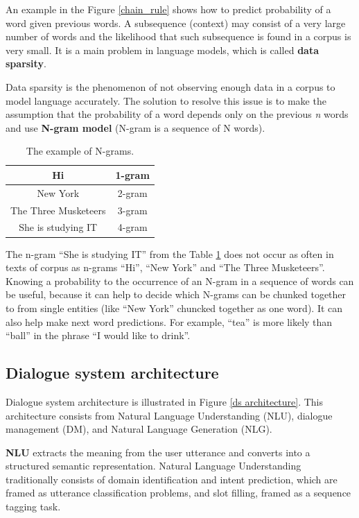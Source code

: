 An example in the Figure \ref{chain_rule} shows how to predict probability of a word given previous words. A subsequence (context) may consist of a very large number of words and the likelihood that such subsequence is found in a corpus is very small. It is a main problem in language models, which is called \textbf{data sparsity}.

Data sparsity is the phenomenon of not observing enough data in a corpus to model language accurately. The solution to resolve this issue is to make the assumption that the probability of a word depends only on the previous \textit{n} words and use \textbf{N-gram model} (N-gram is a sequence of N words).

\begin{table}[t]
  \centering
   \begin{tabular}{|c|c|} 
   \hline
    Hi & 1-gram \\
   \hline
    New York & 2-gram \\
   \hline
   The Three Musketeers & 3-gram \\
   \hline
   She is studying IT & 4-gram \\
   \hline
   \end{tabular}
   \caption{The example of N-grams.}
  \label{tab:n_gram}
\end{table}

The n-gram ``She is studying IT'' from the Table \ref{tab:n_gram} does not occur as often in texts of corpus as n-grams ``Hi'', ``New York'' and ``The Three Musketeers''. Knowing a probability to the occurrence of an N-gram in a sequence of words can be useful, because it can help to decide which N-grams can be chunked together to from single entities (like ``New York'' chuncked together as one word). It can also help make next word predictions. For example, ``tea'' is more likely than ``ball'' in the phrase ``I would like to drink''.



\subsection{Dialogue system architecture} 
Dialogue system architecture is illustrated in Figure \ref{ds architecture}. This architecture consists from Natural Language Understanding (NLU), dialogue management (DM), and Natural Language Generation (NLG).

\textbf{NLU} extracts the meaning from the user utterance and converts into a structured semantic representation. Natural Language Understanding traditionally consists of domain identification and intent prediction, which are framed as utterance classification problems, and slot filling, framed as a sequence tagging task.

